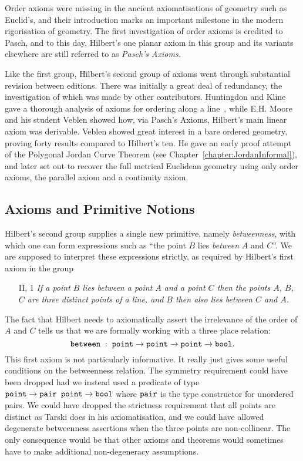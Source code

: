 Order axioms were missing in the ancient axiomatisations of geometry such as Euclid's, and their introduction marks an important milestone in the modern rigorisation of geometry. The first investigation of order axioms is credited to Pasch, and to this day, Hilbert's one planar axiom in this group and its variants elsewhere are still referred to as \emph{Pasch's Axioms.}

Like the first group, Hilbert's second group of axioms went through substantial revision between editions. There was initially a great deal of redundancy, the investigation of which was made by other contributors. Huntingdon and Kline gave a thorough analysis of axioms for ordering along a line~\cite{AnalysisBetweenness}, while E.H. Moore and his student Veblen showed how, via Pasch's Axioms, Hilbert's main linear axiom was derivable. Veblen showed great interest in a bare ordered geometry, proving forty results compared to Hilbert's ten. He gave an early proof attempt of the Polygonal Jordan Curve Theorem (see Chapter~\ref{chapter:JordanInformal}), and later set out to recover the full metrical Euclidean geometry using only order axioms, the parallel axiom and a continuity axiom.

\subsection{Axioms and Primitive Notions}
Hilbert's second group supplies a single new primitive, namely \emph{betweenness}, with which one can form expressions such as ``the point $B$ lies \emph{between} $A$ and $C$''. We are supposed to interpret these expressions strictly, as required by Hilbert's first axiom in the group
\begin{enumerate}
\item[II, 1] \emph{If a point $B$ lies between a point $A$ and a point $C$ then the points $A$, $B$, $C$ are three distinct points of a line, and $B$ then also lies between $C$ and $A$.}
\end{enumerate}
The fact that Hilbert needs to axiomatically assert the irrelevance of the order of $A$ and $C$ tells us that we are formally working with a three place relation:
\begin{displaymath}
\texttt{between}\;:\;\texttt{point}\rightarrow\texttt{point}\rightarrow\texttt{point}\rightarrow\texttt{bool}.
\end{displaymath}
This first axiom is not particularly informative. It really just gives some useful conditions on the betweenness relation. The symmetry requirement could have been dropped had we instead used a predicate of type $\texttt{point}\rightarrow \texttt{pair point} \rightarrow \texttt{bool}$ where $\texttt{pair}$ is the type constructor for unordered pairs. We could have dropped the strictness requirement that all points are distinct as Tarski does in his axiomatisation, and we could have allowed degenerate betweenness assertions when the three points are non-collinear. The only consequence would be that other axioms and theorems would sometimes have to make additional non-degeneracy assumptions.

